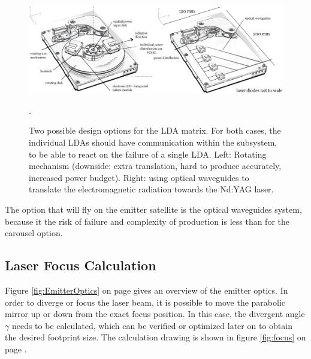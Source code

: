 \begin{figure}[ht!]
\centering
\includegraphics[scale=0.4]{chapters/img/Diode_laser.png} 
\caption[Two possible design options for the \acs{LDA} matrix]{Two possible design options for the \acs{LDA} matrix. For both cases, the individual \acp{LDA} should have communication within the subsystem, to be able to react on the failure of a single \acs{LDA}. Left: Rotating mechanism (downside: extra translation, hard to produce accurately, increased power budget). Right: using optical waveguides to translate the electromagnetic radiation towards the Nd:YAG \acs{laser}.}.
\label{fig:laser_design_option}
\end{figure}

The option that will fly on the emitter satellite is the optical waveguides system, because it the risk of failure and complexity of production is less than for the carousel option.

\subsection{Laser Focus Calculation}
\label{focus}
Figure \ref{fig:EmitterOptics} on page \pageref{fig:EmitterOptics} gives an overview of the emitter optics. In order to diverge or focus the laser beam, it is possible to move the parabolic mirror up or down from the exact focus position. In this case, the divergent angle $\gamma$ needs to be calculated, which can be verified or optimized later on to obtain the desired footprint size. The calculation drawing is shown in figure \ref{fig:focus} on page \pageref{fig:focus}.

